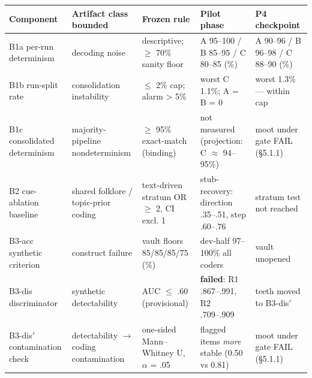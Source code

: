 \begin{longtable}[]{@{}
  >{\raggedright\arraybackslash}p{}
  >{\raggedright\arraybackslash}p{}
  >{\raggedright\arraybackslash}p{}
  >{\raggedright\arraybackslash}p{}
  >{\raggedright\arraybackslash}p{}@{}}
\toprule\noalign{}
\begin{minipage}[b]{\linewidth}\raggedright
Component
\end{minipage} & \begin{minipage}[b]{\linewidth}\raggedright
Artifact class bounded
\end{minipage} & \begin{minipage}[b]{\linewidth}\raggedright
Frozen rule
\end{minipage} & \begin{minipage}[b]{\linewidth}\raggedright
Pilot phase
\end{minipage} & \begin{minipage}[b]{\linewidth}\raggedright
P4 checkpoint
\end{minipage} \\
\midrule\noalign{}
\endhead
\bottomrule\noalign{}
\endlastfoot
B1a per-run determinism & decoding noise & descriptive; $\ge$ 70\% sanity floor & A 95--100 / B 85--95 / C 80--85 (\%) & A 90--96 / B 96--98 / C 88--90 (\%) \\
B1b run-split rate & consolidation instability & $\le$ 2\% cap; alarm \textgreater{} 5\% & worst C 1.1\%; A = B = 0 & worst 1.3\% --- within cap \\
B1c consolidated determinism & majority-pipeline nondeterminism & $\ge$ 95\% exact-match (binding) & not measured (projection: C $\approx$ 94--95\%) & moot under gate FAIL (\S{}5.1.1) \\
B2 cue-ablation baseline & shared folklore / topic-prior coding & text-driven stratum OR $\ge$ 2, CI excl. 1 & stub-recovery: direction .35--.51, step .60--.76 & stratum test not reached \\
B3-acc synthetic criterion & construct failure & vault floors 85/85/85/75 (\%) & dev-half 97--100\% all coders & vault unopened \\
B3-dis discriminator & synthetic detectability & AUC $\le$ .60 (provisional) & \textbf{failed}: R1 .867--.991, R2 .709--.909 & teeth moved to B3-dis$'$ \\
B3-dis$'$ contamination check & detectability $\to$ coding contamination & one-sided Mann--Whitney U, $\alpha$ = .05 & flagged items \emph{more} stable (0.50 vs 0.81) & moot under gate FAIL (\S{}5.1.1) \\

\end{longtable}
